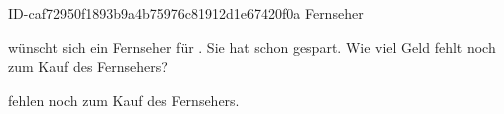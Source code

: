 \begin{exercise}
      {ID-caf72950f1893b9a4b75976c81912d1e67420f0a}
      {Fernseher}
  \ifproblem\problem\par
    \xxa{} wünscht sich ein Fernseher für . Sie hat schon  gespart.
    Wie viel Geld fehlt noch zum Kauf des Fernsehers?
  \fi
  \ifoutcome\outcome\par
    \xxa{} fehlen noch  zum Kauf des Fernsehers.
  \fi
\end{exercise}
